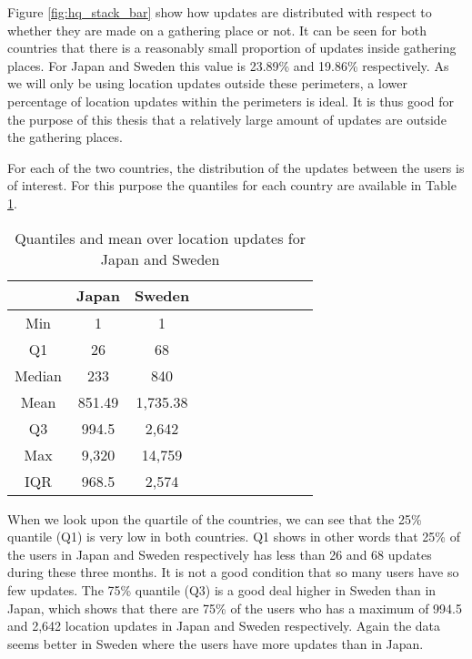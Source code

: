 Figure \ref{fig:hq_stack_bar} show how updates are distributed with respect to whether they are made on a gathering place or not. It can be seen for both countries that there is a reasonably small proportion of updates inside gathering places. For Japan and Sweden this value is 23.89\% and 19.86\% respectively. 
As we will only be using location updates outside these perimeters, a lower percentage of location updates within the perimeters is ideal. It is thus good for the purpose of this thesis that a relatively large amount of updates are outside the gathering places.

For each of the two countries, the distribution of the updates between the users is of interest. For this purpose the quantiles for each country are available in Table \ref{tab:stat_loc_updates}. 


\begin{table}[htbp]
        \centering
        \small
        \setlength\tabcolsep{2pt}
        \begin{tabular}{|c|c|c|c|c|c|c|c|c|c|c|}
            \hline
                         & Japan      &   Sweden      \\[-1pt]
            \hline
                 Min     &    1       &   1           \\
            \hline
                 Q1      &  26        &   68      \\
            \hline
                 Median  & 233     &   840      \\
            \hline
                 Mean    &  851.49   &  1,735.38     \\
            \hline
                 Q3      & 994.5    &   2,642     \\
            \hline
                 Max     &  9,320 &  14,759     \\
            \hline
                 IQR     &  968.5   &   2,574     \\
            \hline
            
        \end{tabular}
        \caption{Quantiles and mean over location updates for Japan and Sweden} %
        \label{tab:stat_loc_updates}
\end{table}


When we look upon the quartile of the countries, we can see that the 25\% quantile (Q1) is very low in both countries. Q1 shows in other words that 25\% of the users in Japan and Sweden respectively has less than 26 and 68 updates during these three months. It is not a good condition that so many users have so few updates. The 75\% quantile (Q3) is a good deal higher in Sweden than in Japan, which shows that there are 75\% of the users who has a maximum of 994.5 and 2,642 location updates in Japan and Sweden respectively. Again the data seems better in Sweden where the users have more updates than in Japan. \\ 


